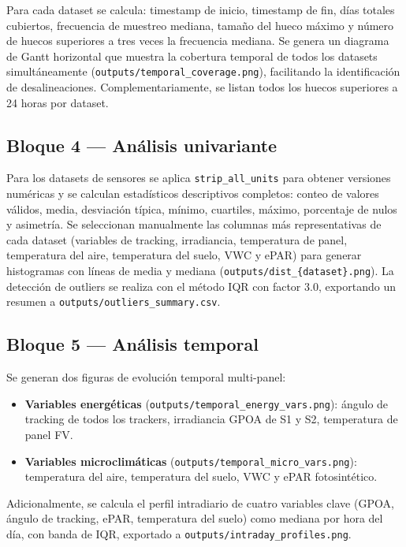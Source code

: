 \documentclass[12pt, a4paper]{article}
\begin{document}
Para cada dataset se calcula: timestamp de inicio, timestamp de fin, días totales cubiertos, frecuencia de muestreo mediana, tamaño del hueco máximo y número de huecos superiores a tres veces la frecuencia mediana. Se genera un diagrama de Gantt horizontal que muestra la cobertura temporal de todos los datasets simultáneamente (\texttt{outputs/temporal\_coverage.png}), facilitando la identificación de desalineaciones. Complementariamente, se listan todos los huecos superiores a 24 horas por dataset.

\subsection{Bloque 4 — Análisis univariante}

Para los datasets de sensores se aplica \texttt{strip\_all\_units} para obtener versiones numéricas y se calculan estadísticos descriptivos completos: conteo de valores válidos, media, desviación típica, mínimo, cuartiles, máximo, porcentaje de nulos y asimetría. Se seleccionan manualmente las columnas más representativas de cada dataset (variables de tracking, irradiancia, temperatura de panel, temperatura del aire, temperatura del suelo, VWC y ePAR) para generar histogramas con líneas de media y mediana (\texttt{outputs/dist\_\{dataset\}.png}). La detección de outliers se realiza con el método IQR con factor 3.0, exportando un resumen a \texttt{outputs/outliers\_summary.csv}.

\subsection{Bloque 5 — Análisis temporal}

Se generan dos figuras de evolución temporal multi-panel:

\begin{itemize}[leftmargin=1.5cm]
    \item \textbf{Variables energéticas} (\texttt{outputs/temporal\_energy\_vars.png}): ángulo de tracking de todos los trackers, irradiancia GPOA de S1 y S2, temperatura de panel FV.
    \item \textbf{Variables microclimáticas} (\texttt{outputs/temporal\_micro\_vars.png}): temperatura del aire, temperatura del suelo, VWC y ePAR fotosintético.
\end{itemize}

Adicionalmente, se calcula el perfil intradiario de cuatro variables clave (GPOA, ángulo de tracking, ePAR, temperatura del suelo) como mediana por hora del día, con banda de IQR, exportado a \texttt{outputs/intraday\_profiles.png}.
\end{document}

